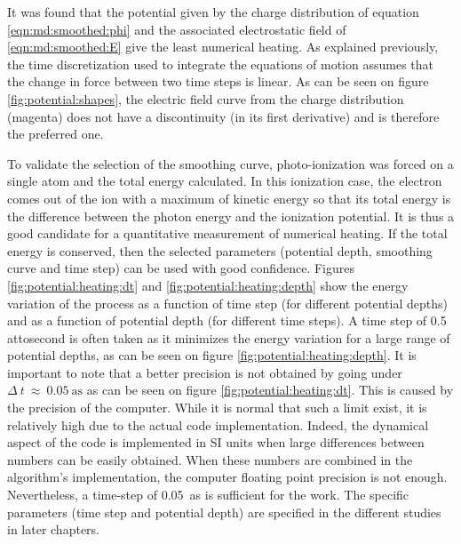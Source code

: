 It was found that the potential given by the charge distribution of equation
\eqref{eqn:md:smoothed:phi} and the associated electrostatic field of
\eqref{eqn:md:smoothed:E} give the least numerical heating. As explained
previously, the time discretization used to integrate the equations of motion
assumes that the change in force between two time steps is linear. As can be
seen on figure \ref{fig:potential:shapes}, the electric field curve from the
charge distribution
(magenta) does not have a discontinuity (in its first derivative)
and is therefore the preferred one.

To validate the selection of the smoothing curve, photo-ionization was forced
on a single atom and the total energy calculated. In this ionization case, the
electron comes out of the ion with a maximum of kinetic energy so that
its total energy is the difference between the photon energy and the ionization
potential. It is thus a good candidate for a quantitative measurement of
numerical heating. If the total
energy is conserved, then the selected parameters (potential depth, smoothing
curve and time step) can be used with good confidence. Figures
\ref{fig:potential:heating:dt} and \ref{fig:potential:heating:depth} show the
energy variation of the process as a function of time step (for different
potential depths) and as a function of potential depth (for different time
steps). A time step of 0.5 attosecond is often taken as
it minimizes the energy variation for a large
range of potential depths, as can be seen on figure
\ref{fig:potential:heating:depth}.
It is important to note that a better precision is not obtained by going
under $\Delta~t~\approx~0.05~\textrm{as}$ as can be seen on figure
\ref{fig:potential:heating:dt}. This is caused by the precision of the computer.
While it is normal that such a limit exist, it is relatively high due to the
actual code implementation. Indeed, the dynamical aspect of the code is
implemented in SI units when large differences between numbers can be easily
obtained. When these numbers are combined in the algorithm's implementation,
the computer floating point precision is not enough. Nevertheless, a time-step
of 0.05~as is sufficient for the work. The specific
parameters (time step and potential depth) are specified in the different
studies in later chapters.

